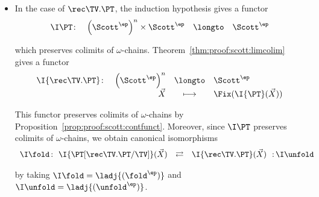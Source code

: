 \begin{itemize}
Moreover,
we let $\I{\inj_1} \colon \I\PT(\vec X) \to \I\PT(\vec X) + \I\PTbis(\vec X)$
and $\I{\inj_2} \colon \I\PTbis(\vec X) \to \I\PT(\vec X) + \I\PTbis(\vec X)$
be the morphisms $\inj_1$ and $\inj_2$ defined in~\S\ref{sec:proof:sem:pure:sum}.

Further, the terms
$\cse\ M\ \copair{x_1 \mapsto N_1 \mid x_2 \mapsto N_2}$
are interpreted using the operation
$\copair{\pl, \pl}$, also defined in~\S\ref{sec:proof:sem:pure:sum}.

\item
In the case of $\rec \TV.\PT$,
the induction hypothesis gives a functor
\[
\begin{array}{*{4}{l}}
  \I\PT \colon
& \left( \Scott^\ep \right)^{n} \times \Scott^\ep
& \longto
& \Scott^\ep
\end{array}
\]

\noindent
which preserves colimits of $\omega$-chains.
Theorem~\ref{thm:proof:scott:limcolim}
gives a functor
\[
\begin{array}{l r c l}
  \I{\rec \TV.\PT} \colon
& \left( \Scott^\ep \right)^{n} 
& \longto
& \Scott^\ep
\\
%
& \vec X
& \longmapsto
& \Fix (\I{\PT}(\vec X))
\end{array}
\]

\noindent
This functor preserves colimits of $\omega$-chains by
Proposition~\ref{prop:proof:scott:contfunct}.
%
Moreover, since $\I\PT$ preserves
colimits of $\omega$-chains,
we obtain canonical isomorphisms
\[
\begin{array}{l @{\,:~~} l l l @{~~:\,} l}
  \I\fold
& \I{\PT[\rec \TV.\PT/\TV]}(\vec X)
& \rightleftarrows
& \I{\rec \TV.\PT}(\vec X)
& \I\unfold
\end{array}
\]

\noindent
by taking
$\I\fold = \ladj{(\fold^\ep)}$
and
$\I\unfold = \ladj{(\unfold^\ep)}$.
\end{itemize}

